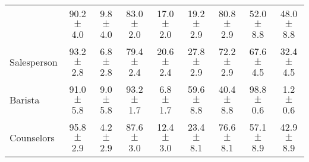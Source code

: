 \begin{table*}[p]
{\begin{tabular}{l|cc|cc|cc|cc}
& 90.2 $\pm$ 4.0 & 9.8 $\pm$ 4.0
& 83.0 $\pm$ 2.0 & 17.0 $\pm$ 2.0
& 19.2 $\pm$ 2.9 & 80.8 $\pm$ 2.9
& 52.0 $\pm$ 8.8 & 48.0 $\pm$ 8.8
\\
Salesperson
& 93.2 $\pm$ 2.8 & 6.8 $\pm$ 2.8
& 79.4 $\pm$ 2.4 & 20.6 $\pm$ 2.4
& 27.8 $\pm$ 2.9 & 72.2 $\pm$ 2.9
& 67.6 $\pm$ 4.5 & 32.4 $\pm$ 4.5
\\
Barista
& 91.0 $\pm$ 5.8 & 9.0 $\pm$ 5.8
& 93.2 $\pm$ 1.7 & 6.8 $\pm$ 1.7
& 59.6 $\pm$ 8.8 & 40.4 $\pm$ 8.8
& 98.8 $\pm$ 0.6 & 1.2 $\pm$ 0.6
\\
Counselors
& 95.8 $\pm$ 2.9 & 4.2 $\pm$ 2.9
& 87.6 $\pm$ 3.0 & 12.4 $\pm$ 3.0
& 23.4 $\pm$ 8.1 & 76.6 $\pm$ 8.1
& 57.1 $\pm$ 8.9 & 42.9 $\pm$ 8.9
\\

\bottomrule
\end{tabular}
}
\label{appendix:results-gender-part2}
\end{table*}